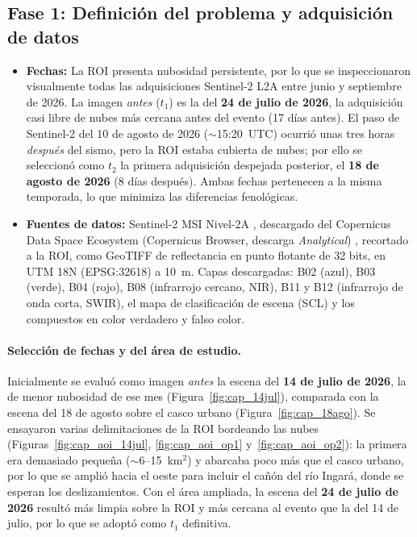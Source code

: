 \documentclass[12pt]{article}
\begin{document}
\subsection{Fase 1: Definición del problema y adquisición de datos}
\begin{itemize}
    \item \textbf{Fechas:} La ROI presenta nubosidad persistente, por lo que se inspeccionaron visualmente todas las adquisiciones Sentinel-2 L2A entre junio y septiembre de 2026. La imagen \emph{antes} ($t_1$) es la del \textbf{24 de julio de 2026}, la adquisición casi libre de nubes más cercana antes del evento (17 días antes). El paso de Sentinel-2 del 10 de agosto de 2026 ($\sim$15:20~UTC) ocurrió unas tres horas \emph{después} del sismo, pero la ROI estaba cubierta de nubes; por ello se seleccionó como $t_2$ la primera adquisición despejada posterior, el \textbf{18 de agosto de 2026} (8 días después). Ambas fechas pertenecen a la misma temporada, lo que minimiza las diferencias fenológicas.
    \item \textbf{Fuentes de datos:} Sentinel-2 MSI Nivel-2A \parencite{ESA2023}, descargado del Copernicus Data Space Ecosystem (Copernicus Browser, descarga \emph{Analytical}) \parencite{CDSE}, recortado a la ROI, como GeoTIFF de reflectancia en punto flotante de 32 bits, en UTM 18N (EPSG:32618) a 10~m. Capas descargadas: B02 (azul), B03 (verde), B04 (rojo), B08 (infrarrojo cercano, NIR), B11 y B12 (infrarrojo de onda corta, SWIR), el mapa de clasificación de escena (SCL) y los compuestos en color verdadero y falso color.
\end{itemize}

\paragraph{Selección de fechas y del área de estudio.} Inicialmente se evaluó como imagen \emph{antes} la escena del \textbf{14 de julio de 2026}, la de menor nubosidad de ese mes (Figura~\ref{fig:cap_14jul}), comparada con la escena del 18 de agosto sobre el casco urbano (Figura~\ref{fig:cap_18ago}). Se ensayaron varias delimitaciones de la ROI bordeando las nubes (Figuras~\ref{fig:cap_aoi_14jul}, \ref{fig:cap_aoi_op1} y~\ref{fig:cap_aoi_op2}): la primera era demasiado pequeña ($\sim$6--15~km$^2$) y abarcaba poco más que el casco urbano, por lo que se amplió hacia el oeste para incluir el cañón del río Ingará, donde se esperan los deslizamientos. Con el área ampliada, la escena del \textbf{24 de julio de 2026} resultó más limpia sobre la ROI y más cercana al evento que la del 14 de julio, por lo que se adoptó como $t_1$ definitiva.
\end{document}
